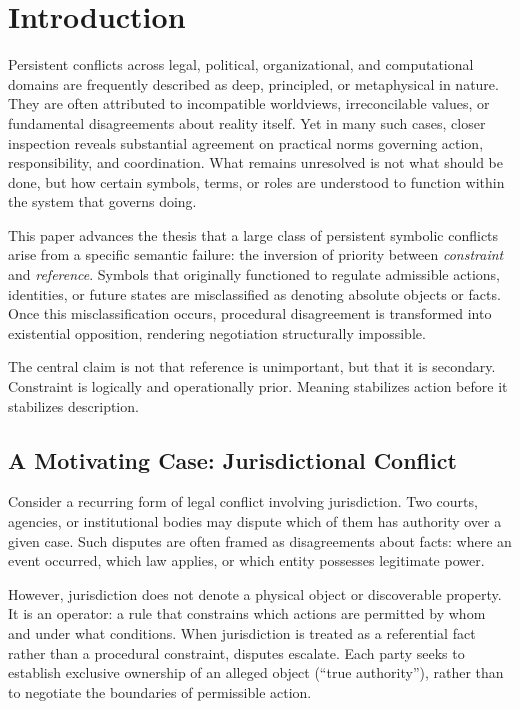 \documentclass[11pt]{article}
\begin{document}
\section{Introduction}

Persistent conflicts across legal, political, organizational, and computational
domains are frequently described as deep, principled, or metaphysical in nature.
They are often attributed to incompatible worldviews, irreconcilable values, or
fundamental disagreements about reality itself. Yet in many such cases, closer
inspection reveals substantial agreement on practical norms governing action,
responsibility, and coordination. What remains unresolved is not what should be
done, but how certain symbols, terms, or roles are understood to function within
the system that governs doing.

This paper advances the thesis that a large class of persistent symbolic
conflicts arise from a specific semantic failure: the inversion of priority
between \emph{constraint} and \emph{reference}. Symbols that originally functioned
to regulate admissible actions, identities, or future states are misclassified as
denoting absolute objects or facts. Once this misclassification occurs,
procedural disagreement is transformed into existential opposition, rendering
negotiation structurally impossible.

The central claim is not that reference is unimportant, but that it is secondary.
Constraint is logically and operationally prior. Meaning stabilizes action before
it stabilizes description.

\subsection{A Motivating Case: Jurisdictional Conflict}

Consider a recurring form of legal conflict involving jurisdiction. Two courts,
agencies, or institutional bodies may dispute which of them has authority over a
given case. Such disputes are often framed as disagreements about facts: where an
event occurred, which law applies, or which entity possesses legitimate power.

However, jurisdiction does not denote a physical object or discoverable property.
It is an operator: a rule that constrains which actions are permitted by whom and
under what conditions. When jurisdiction is treated as a referential fact rather
than a procedural constraint, disputes escalate. Each party seeks to establish
exclusive ownership of an alleged object (“true authority”), rather than to
negotiate the boundaries of permissible action.
\end{document}
